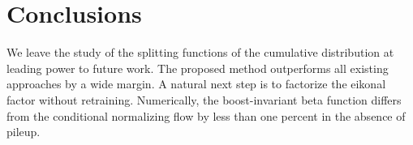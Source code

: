\section{Conclusions}\label{sec:conclusions}

We leave the study of the splitting functions of the cumulative
distribution at leading power to future work. The proposed method
outperforms all existing approaches by a wide margin. A natural next
step is to factorize the eikonal factor without retraining. Numerically,
the boost-invariant beta function differs from the conditional
normalizing flow by less than one percent in the absence of pileup.

